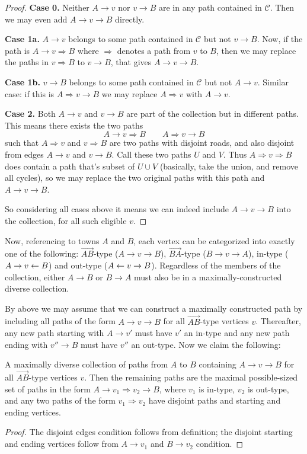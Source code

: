 \documentclass[11pt,a4paper]{article}
\begin{document}
\begin{enumerate}
\begin{proof}
			\textbf{Case 0.} Neither $A\to v$ nor $v\to B$ are in any path contained in $\mathcal{C}$. 
			Then we may even add $A\to v\to B$ directly. 
			
			\textbf{Case 1a.} $A\to v$ belongs to some path contained in $\mathcal{C}$ but not $v\to B$. 
			Now, if the path is $A\to v\Rightarrow B$ where $\Rightarrow$ denotes a path from $v$ to $B$, then we may replace the paths in $v\Rightarrow B$ to $v\to B$, that gives $A\to v\to B$.  
			
			\textbf{Case 1b.} $v\to B$ belongs to some path contained in $\mathcal{C}$ but not $A\to v$. 
			Similar case: if this is $A\Rightarrow v\to B$ we may replace $A\Rightarrow v$ with $A\to v$. 
			
			\textbf{Case 2.} Both $A\to v$ and $v\to B$ are part of the collection but in different paths. 
			This means there exists the two paths 
			\[
			A\to v\Rightarrow B\qquad A\Rightarrow v\to B
			\]
			such that $A\Rightarrow v$ and $v\Rightarrow B$ are two paths with disjoint roads, and also disjoint from edges $A\to v$ and $v\to B$. 
			Call these two paths $U$ and $V$. 
			Thus $A\Rightarrow v\Rightarrow B$ does contain a path that's subset of $U\cup V$ (basically, take the union, and remove all cycles), 
			so we may replace the two original paths with this path and $A\to v\to B$. 
			
			So considering all cases above it means we can indeed include $A\to v\to B$ into the collection, for all such eligible $v$. 
		\end{proof}
	    
	    Now, referencing to towns $A$ and $B$, each vertex can be categorized into exactly one of the following: $\vec{AB}$-type ($A\to v\to B$), $\vec{BA}$-type ($B\to v\to A$), 
	    in-type ($A\to v\leftarrow B$) and out-type ($A\leftarrow v\to B$). 
	    Regardless of the members of the collection, either $A\to B$ or $B\to A$ must also be in a maximally-constructed diverse collection. 
	    
	    By above we may assume that we can construct a maximally constructed path by including all paths of the form $A\to v\to B$ for all $\vec{AB}$-type vertices $v$. 
	    Thereafter, any new path starting with $A\to v'$ must have $v'$ an in-type and any new path ending with $v''\to B$ must have $v''$ an out-type. 
	    Now we claim the following:
	    
	    \begin{lemma}
	    	\label{lemma_c4b}
	        A maximally diverse collection of paths from $A$ to $B$ containing $A\to v\to B$ for all $\vec{AB}$-type vertices $v$. Then the remaining paths are the maximal possible-sized set of paths in the form $A\to v_1\Rightarrow v_2\to B$, 
	        where $v_1$ is in-type, $v_2$ is out-type, 
	        and any two paths of the form $v_1\Rightarrow v_2$ have disjoint paths and starting and ending vertices. 
	    \end{lemma}
        \begin{proof}
        	The disjoint edges condition follows from definition; the disjoint starting and ending vertices follow from $A\to v_1$ and $B\to v_2$ condition. 
        	

\end{proof}
\end{enumerate}
\end{document}
